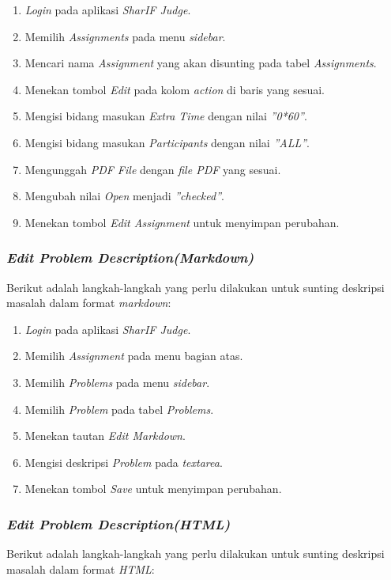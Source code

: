 \begin{enumerate}
	\item \textit{Login} pada aplikasi \textit{SharIF Judge}.
	\item Memilih \textit{Assignments} pada menu \textit{sidebar}.
	\item Mencari nama \textit{Assignment} yang akan disunting pada tabel \textit{Assignments}.
	\item Menekan tombol \textit{Edit} pada kolom \textit{action} di baris yang sesuai.
	\item Mengisi bidang masukan \textit{Extra Time} dengan nilai \textit{''0*60''}.
	\item Mengisi bidang masukan \textit{Participants} dengan nilai \textit{''ALL''}.
	\item Mengunggah \textit{PDF File} dengan \textit{file PDF} yang sesuai.
	\item Mengubah nilai \textit{Open} menjadi \textit{''checked''}.
	\item Menekan tombol \textit{Edit Assignment} untuk menyimpan perubahan.
\end{enumerate}

\subsubsection{\textit{Edit Problem Description(Markdown)}}
\label{subsubsec:skenario_edit_problem_description_markdown}
Berikut adalah langkah-langkah yang perlu dilakukan untuk sunting deskripsi masalah dalam format \textit{markdown}:

\begin{enumerate}
	\item \textit{Login} pada aplikasi \textit{SharIF Judge}.
	\item Memilih \textit{Assignment} pada menu bagian atas.
	\item Memilih \textit{Problems} pada menu \textit{sidebar}.
	\item Memilih \textit{Problem} pada tabel \textit{Problems}.
	\item Menekan tautan \textit{Edit Markdown}.
	\item Mengisi deskripsi \textit{Problem} pada \textit{textarea}.
	\item Menekan tombol \textit{Save} untuk menyimpan perubahan.
\end{enumerate}

\subsubsection{\textit{Edit Problem Description(HTML)}}
\label{subsubsec:skenario_edit_problem_description_html}
Berikut adalah langkah-langkah yang perlu dilakukan untuk sunting deskripsi masalah dalam format \textit{HTML}:

